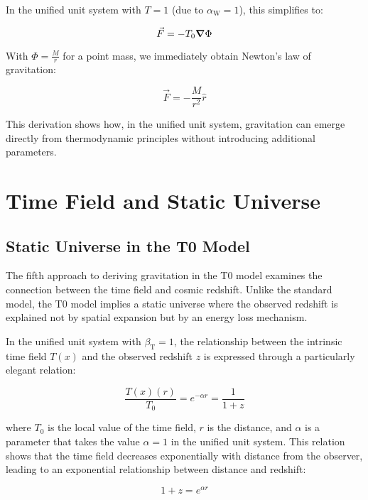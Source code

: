 \documentclass[12pt,a4paper]{article}
\newcommand{\Tfield}{T(x)}
\newcommand{\Tzero}{T_0}
\newcommand{\betaT}{\beta_{\text{T}}}
\newcommand{\alphaW}{\alpha_{\text{W}}}
\begin{document}
	In the unified unit system with \(T = 1\) (due to \(\alphaW = 1\)), this simplifies to:
	
	\begin{equation}
		\vec{F} = -\Tzero \grad \Phi
	\end{equation}
	
	With \(\Phi = \frac{M}{r}\) for a point mass, we immediately obtain Newton’s law of gravitation:
	
	\begin{equation}
		\vec{F} = -\frac{M}{r^2} \hat{r}
	\end{equation}
	
	This derivation shows how, in the unified unit system, gravitation can emerge directly from thermodynamic principles without introducing additional parameters.
	
	\section{Time Field and Static Universe}
	
	\subsection{Static Universe in the T0 Model}
	The fifth approach to deriving gravitation in the T0 model examines the connection between the time field and cosmic redshift. Unlike the standard model, the T0 model implies a static universe where the observed redshift is explained not by spatial expansion but by an energy loss mechanism.
	
	In the unified unit system with \(\betaT = 1\), the relationship between the intrinsic time field \(\Tfield\) and the observed redshift \(z\) is expressed through a particularly elegant relation:
	
	\begin{equation}
		\frac{\Tfield(r)}{\Tzero} = e^{-\alpha r} = \frac{1}{1+z}
	\end{equation}
	
	where \(\Tzero\) is the local value of the time field, \(r\) is the distance, and \(\alpha\) is a parameter that takes the value \(\alpha = 1\) in the unified unit system. This relation shows that the time field decreases exponentially with distance from the observer, leading to an exponential relationship between distance and redshift:
	
	\begin{equation}
		1 + z = e^{\alpha r}
	\end{equation}
	
\end{document}
